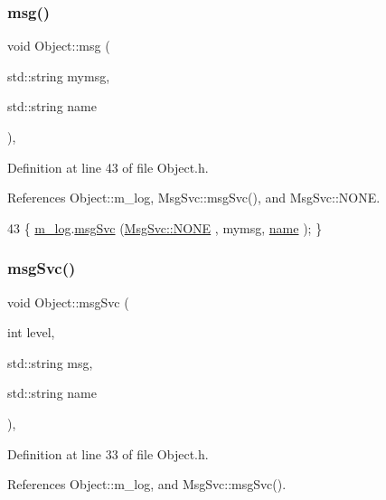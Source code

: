 \subsubsection{\texorpdfstring{msg()}{msg()}\hspace{0.1cm}{\footnotesize\ttfamily [2/2]}}
{\footnotesize\ttfamily void Object\+::msg (\begin{DoxyParamCaption}\item[{std\+::string}]{mymsg,  }\item[{std\+::string}]{name }\end{DoxyParamCaption})\hspace{0.3cm}{\ttfamily [inline]}, {\ttfamily [inherited]}}



Definition at line 43 of file Object.\+h.



References Object\+::m\+\_\+log, Msg\+Svc\+::msg\+Svc(), and Msg\+Svc\+::\+N\+O\+NE.


\begin{DoxyCode}
43 \{ \hyperlink{classObject_a0d269813dd7ac1f24bc143031e2963f2}{m\_log}.\hyperlink{classMsgSvc_ad25f18047920cc59a314e5098259711c}{msgSvc} (\hyperlink{classMsgSvc_ae671eb7301996cd049d2da8a65925926a9be9ae32fed8e1e6eba4a58692210fbd}{MsgSvc::NONE}    , mymsg, \hyperlink{classObject_a300f4c05dd468c7bb8b3c968868443c1}{name} ); \}
\end{DoxyCode}
\mbox{\label{classObject_a3f9d5537ebce0c0f2bf6ae4d92426f3c}} 
\subsubsection{\texorpdfstring{msg\+Svc()}{msgSvc()}}
{\footnotesize\ttfamily void Object\+::msg\+Svc (\begin{DoxyParamCaption}\item[{int}]{level,  }\item[{std\+::string}]{msg,  }\item[{std\+::string}]{name }\end{DoxyParamCaption})\hspace{0.3cm}{\ttfamily [inline]}, {\ttfamily [inherited]}}



Definition at line 33 of file Object.\+h.



References Object\+::m\+\_\+log, and Msg\+Svc\+::msg\+Svc().



